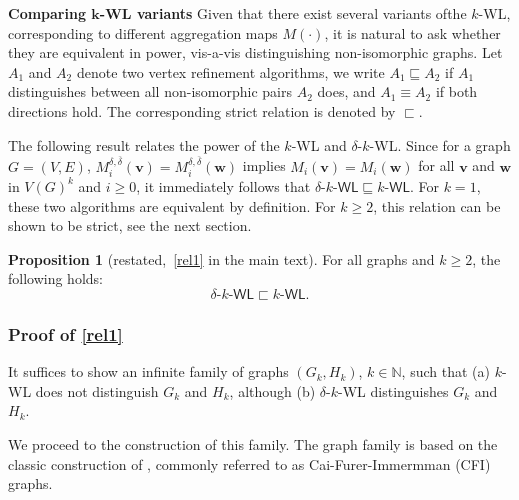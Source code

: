 \documentclass{article}
\newcommand{\xhdr}[1]{{\noindent\bfseries #1}}
\theoremstyle{definition}
\newtheorem{proposition}[theorem]{Proposition}
\newcommand{\ndelta}{\ensuremath{\overline{\delta}}}
\renewcommand{\vec}[1]{\mathbf{#1}}
\newcommand{\kwl}{$k$-\textsf{WL}\xspace}
\newcommand{\deltakwl}{$\delta$-$k$-\textsf{WL}\xspace}
\newcommand{\kwlm}{k\textrm{-}\textsf{WL}\xspace}
\newcommand{\deltakwlm}{\delta\textrm{-}k\textrm{-}\textsf{WL}\xspace}
\begin{document}
\xhdr{Comparing $\boldsymbol{k}$-\textsf{WL} variants} Given that there exist several variants ofthe \kwl, corresponding to different aggregation maps $M(\cdot)$, it is natural to ask whether they are equivalent in power, vis-a-vis distinguishing non-isomorphic graphs. Let $A_1$ and $A_2$ denote two vertex refinement algorithms, we write
$ A_1 \sqsubseteq A_2$ if $A_1$ distinguishes between all non-isomorphic pairs $A_2$ does, and $A_1 \equiv A_2$ if both directions hold. The corresponding strict relation is denoted by $\sqsubset$. 

The following result relates the power of the \kwl and \deltakwl. Since for a graph $G=(V,E)$,  $M^{\delta,\ndelta}_i(\vec{v}) = M^{\delta,\ndelta}_i(\vec{w})$ implies $M_i(\vec{v}) = M_i(\vec{w})$  for all $\vec{v}$ and $\vec{w}$ in $V(G)^k$ and $i\geq 0$, it immediately follows that $\deltakwlm \sqsubseteq \kwlm$. 
For $k=1$, these two algorithms are equivalent by definition. For $k \geq 2$, this relation can be shown to be strict, see the next section.


\begin{proposition}[restated,~\cref{rel1} in the main text]\label{app:rel1} For all graphs and $k \geq 2 $, the following holds: 	\begin{equation*}
	\deltakwlm \sqsubset \kwlm.
	\end{equation*}
\end{proposition}

\subsubsection{Proof of \cref{rel1}}\label{proofrel1}

It suffices to show an infinite family of graphs $(G_k,H_k)$, $k \in \mathbb{N}$, such that (a) \kwl does not distinguish $G_k$ and $H_k$, although (b) 
\deltakwl distinguishes $G_k$ and $H_k$. 

We proceed to the construction of this family. The graph family is based on the classic construction of \cite{Cai+1992}, commonly referred to as Cai-Furer-Immermman (CFI) graphs. 
\end{document}
